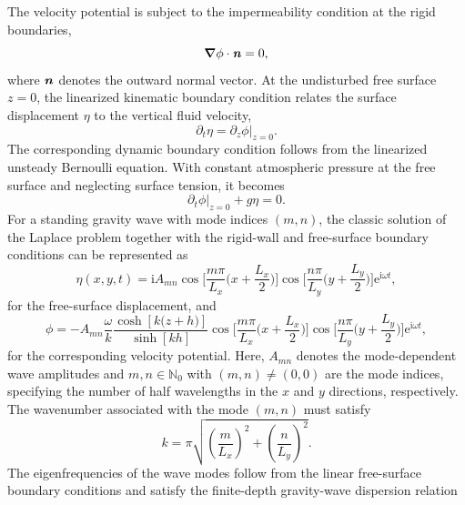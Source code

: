 \documentclass[aps,prfluids,reprint,superscriptaddress]{revtex4-2}
\newcommand{\h}[1]{\textbf{\textit{#1}}}
\newcommand{\ii}[1]{\text{#1}}
\begin{document}
The velocity potential is subject to the impermeability condition at the rigid boundaries, 
\begin{equation} 
\bm\nabla\phi\cdot\h n=0, \label{eq:wave_no_penetration} 
\end{equation} 
where $\h n$ denotes the outward normal vector. At the undisturbed free surface $z=0$, the linearized kinematic boundary condition relates the surface displacement $\eta$ to the vertical fluid velocity, 
\begin{equation} 
\partial_t\eta = \left.\partial_z\phi\right|_{z=0}. \label{eq:free_surface_kinematic} 
\end{equation} 
The corresponding dynamic boundary condition follows from the linearized unsteady Bernoulli equation. With constant atmospheric pressure at the free surface and neglecting surface tension, it becomes 
\begin{equation} 
\left.\partial_t\phi\right|_{z=0} + g\eta = 0. \label{eq:free_surface_dynamic} \end{equation} 
For a standing gravity wave with mode indices $(m,n)$, the classic solution of the Laplace problem together with the rigid-wall and free-surface boundary conditions can be represented as
\begin{equation}
	\eta (x,y,t) = \ii i A_{mn}
	\cos{\biggl[ \frac{m\pi}{L_x}
		\biggl(x + \frac{L_x}{2}\biggr) \biggr]}
	\cos{\biggl[ \frac{n\pi}{L_y}
		\biggl(y + \frac{L_y}{2}\biggr) \biggr]}
	\ii{e}^{\ii i\omega t},
	\label{eq:eta}
\end{equation}
for the free-surface displacement, and
\begin{equation}
	\phi = -A_{mn}
	\frac{\omega}{k}
	\frac{\cosh{[k\bigl(z + h \bigr)]}}{\sinh{[kh]}}
	\cos{\biggl[ \frac{m\pi}{L_x}
		\biggl(x + \frac{L_x}{2}\biggr) \biggr]}
	\cos{\biggl[ \frac{n\pi}{L_y}
		\biggl(y + \frac{L_y}{2}\biggr) \biggr]}
	\ii{e}^{\ii i\omega t},
	\label{eq:vel_potential}
\end{equation}
for the corresponding velocity potential. Here, $A_{mn}$ denotes the mode-dependent wave amplitudes and $m,n\in\mathbb{N}_0$ with $(m,n)\neq(0,0)$ are the mode indices, specifying the number of half wavelengths in the $x$ and $y$ directions, respectively.
The wavenumber associated with the mode $(m,n)$ must satisfy
\begin{equation}
	k = \pi\sqrt{
		\left(\frac{m}{L_x}\right)^2
		+
		\left(\frac{n}{L_y}\right)^2
	}.
	\label{eq:wavenumber}
\end{equation}
The eigenfrequencies of the wave modes follow from the linear free-surface boundary conditions and satisfy the finite-depth gravity-wave dispersion relation
\end{document}
